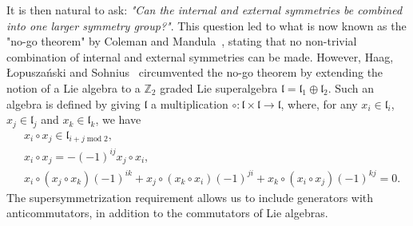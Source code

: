 It is then natural to ask: \emph{"Can the internal and external symmetries be combined into one larger symmetry group?"}.
This question led to what is now known as the "no-go theorem" by Coleman and Mandula~\cite{Coleman:1967ad}, stating that no non-trivial combination of internal and external symmetries can be made.
However, Haag, \L opusza\'nski and Sohnius~\cite{Haag:1974qh} circumvented the no-go theorem by extending the notion of a Lie algebra to a $\mathbb{Z}_2$ graded Lie superalgebra $\mathfrak{l}=\mathfrak{l}_1\oplus\mathfrak{l}_2$. 
Such an algebra is defined by giving $\mathfrak{l}$ a multiplication $\circ:\mathfrak{l}\times\mathfrak{l}\to\mathfrak{l}$, where, for any $x_i\in\mathfrak{l}_i$, $x_j\in\mathfrak{l}_j$ and $x_k\in\mathfrak{l}_k$, we have
\begin{align*}
    &x_i \circ x_j \in \mathfrak{l}_{i+j \operatorname{mod} 2},
    \tag{Grading}
    \\
    &x_i \circ x_j = -(-1)^{ij} x_j \circ x_i,
    \tag{Supersymmetrization}
    \\
    &x_i \circ (x_j \circ x_k) (-1)^{ik}
    + x_j \circ (x_k \circ x_i)(-1)^{ji}
    + x_k \circ (x_i \circ x_j)(-1)^{kj}
    = 0.
    \tag{Generalized Jacobi identity}
\end{align*}
The supersymmetrization requirement allows us to include generators with anticommutators, in addition to the commutators of Lie algebras.

